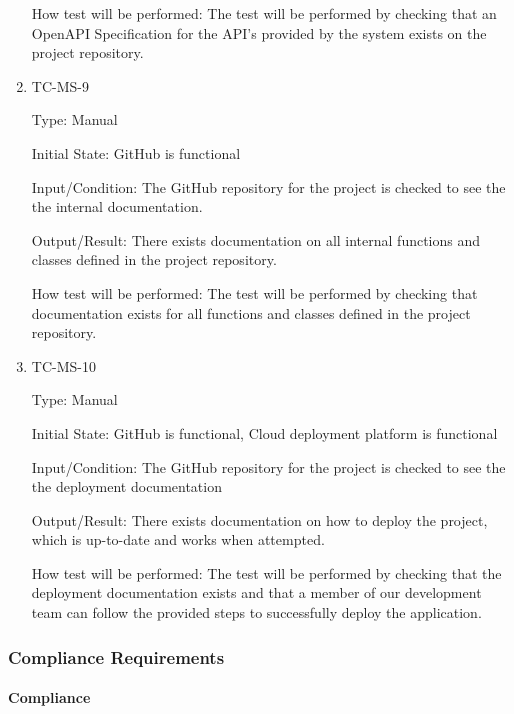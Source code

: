 \documentclass[12pt, titlepage]{article}
\begin{document}
\begin{enumerate}
    How test will be performed: The test will be performed by
    checking that an OpenAPI Specification for the API's provided by
    the system exists on the project repository.

  \item{TC-MS-9\\}

    Type: Manual

    Initial State: GitHub is functional

    Input/Condition: The GitHub repository for the project is checked
    to see the the internal documentation.

    Output/Result: There exists documentation on all internal
    functions and classes defined in the project repository.

    How test will be performed: The test will be performed by
    checking that documentation exists for all functions and classes
    defined in the project repository.

  \item{TC-MS-10\\}

    Type: Manual

    Initial State: GitHub is functional, Cloud deployment platform is functional

    Input/Condition: The GitHub repository for the project is checked
    to see the the deployment documentation

    Output/Result: There exists documentation on how to deploy the
    project, which is up-to-date and works when attempted.

    How test will be performed: The test will be performed by
    checking that the deployment documentation exists and that a
    member of our development team can follow the provided steps to
    successfully deploy the application.

\end{enumerate}

\subsubsection{Compliance Requirements}

\paragraph{Compliance}
\end{document}
